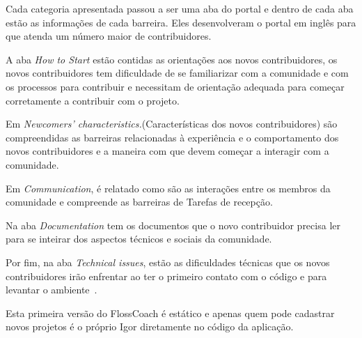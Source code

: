 Cada categoria apresentada passou a ser uma aba do portal e dentro de cada aba 
estão as informações de cada barreira. Eles desenvolveram o portal em inglês
para que atenda um número maior de contribuidores.

A aba \textit{How to Start} estão contidas as orientações aos novos contribuidores, os novos
contribuidores tem dificuldade de se familiarizar com a comunidade e com os processos
para contribuir e necessitam de orientação adequada para começar corretamente a
contribuir com o projeto.

Em \textit{Newcomers’ characteristics.}(Características dos novos contribuidores) são 
compreendidas as barreiras relacionadas à experiência e o comportamento dos novos 
contribuidores e a maneira com que devem começar a interagir com a comunidade.

Em \textit{Communication}, é relatado como são as interações entre 
os membros da comunidade e compreende as barreiras de Tarefas de recepção.

Na aba \textit{Documentation} tem os documentos que o novo contribuidor precisa ler 
para se inteirar dos aspectos técnicos e sociais da comunidade.

Por fim, na aba \textit{Technical issues}, estão as dificuldades técnicas que os novos
contribuidores irão enfrentar ao ter o primeiro contato com o código e para levantar
o ambiente~\cite{steinmancher2015}.

Esta primeira versão do FlossCoach é estático e apenas quem pode cadastrar novos projetos 
é o próprio Igor diretamente no código da aplicação.



